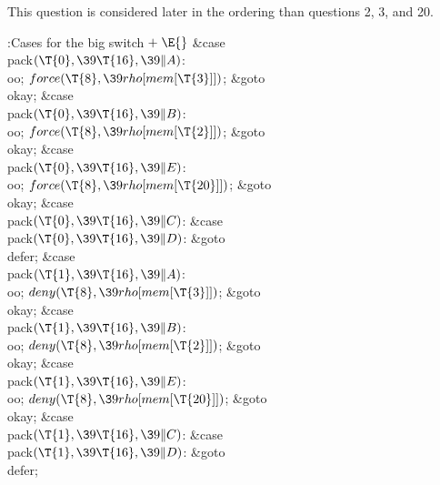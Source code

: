 This question is considered later in the ordering than questions 2, 3, and 20.

\Y\B\4:Cases for the big switch\X${}\mathrel+\E{}$\6
\4\&{case} \\{pack}${}(\T{0},\39\T{16},\39\|A){}$:\5
\\{oo};\5
${}\\{force}(\T{8},\39\\{rho}[\\{mem}[\T{3}]]){}$;\5
\&{goto} \\{okay};\6
\4\&{case} \\{pack}${}(\T{0},\39\T{16},\39\|B){}$:\5
\\{oo};\5
${}\\{force}(\T{8},\39\\{rho}[\\{mem}[\T{2}]]){}$;\5
\&{goto} \\{okay};\6
\4\&{case} \\{pack}${}(\T{0},\39\T{16},\39\|E){}$:\5
\\{oo};\5
${}\\{force}(\T{8},\39\\{rho}[\\{mem}[\T{20}]]){}$;\5
\&{goto} \\{okay};\6
\4\&{case} \\{pack}${}(\T{0},\39\T{16},\39\|C){}$:\5
\&{case} \\{pack}${}(\T{0},\39\T{16},\39\|D){}$:\5
\&{goto} \\{defer};\6
\4\&{case} \\{pack}${}(\T{1},\39\T{16},\39\|A){}$:\5
\\{oo};\5
${}\\{deny}(\T{8},\39\\{rho}[\\{mem}[\T{3}]]){}$;\5
\&{goto} \\{okay};\6
\4\&{case} \\{pack}${}(\T{1},\39\T{16},\39\|B){}$:\5
\\{oo};\5
${}\\{deny}(\T{8},\39\\{rho}[\\{mem}[\T{2}]]){}$;\5
\&{goto} \\{okay};\6
\4\&{case} \\{pack}${}(\T{1},\39\T{16},\39\|E){}$:\5
\\{oo};\5
${}\\{deny}(\T{8},\39\\{rho}[\\{mem}[\T{20}]]){}$;\5
\&{goto} \\{okay};\6
\4\&{case} \\{pack}${}(\T{1},\39\T{16},\39\|C){}$:\5
\&{case} \\{pack}${}(\T{1},\39\T{16},\39\|D){}$:\5
\&{goto} \\{defer};\par
\fi

